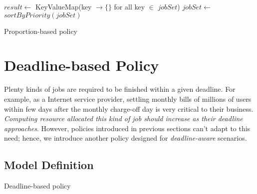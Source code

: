 \begin{algorithm}[H]
  \DontPrintSemicolon %
  $result \gets$ KeyValueMap(key $\to \{\}$ for all key $\in$
  $jobSet$)\;
  $jobSet \gets$ $sortByPriority(jobSet)$\;
  \;
  \caption{Proportion-based policy}
  \label{algo:proportion-based}
\end{algorithm}

\section{Deadline-based Policy}

Plenty kinds of jobs are required to be finished within a given
deadline.
For example, as a Internet service provider, settling monthly bills of
millions of users within few days after the monthly charge-off day is
very critical to their business.
\emph{Computing resource allocated this kind of job should increase as
their deadline approaches}.
However, policies introduced in previous sections can't adapt to this
need; hence, we introduce another policy designed for
\emph{deadline-aware} scenarios.

\subsection{Model Definition}


\begin{algorithm}[H]
  \DontPrintSemicolon %

  \;
  \caption{Deadline-based policy}
  \label{algo:deadline-based}
\end{algorithm}
